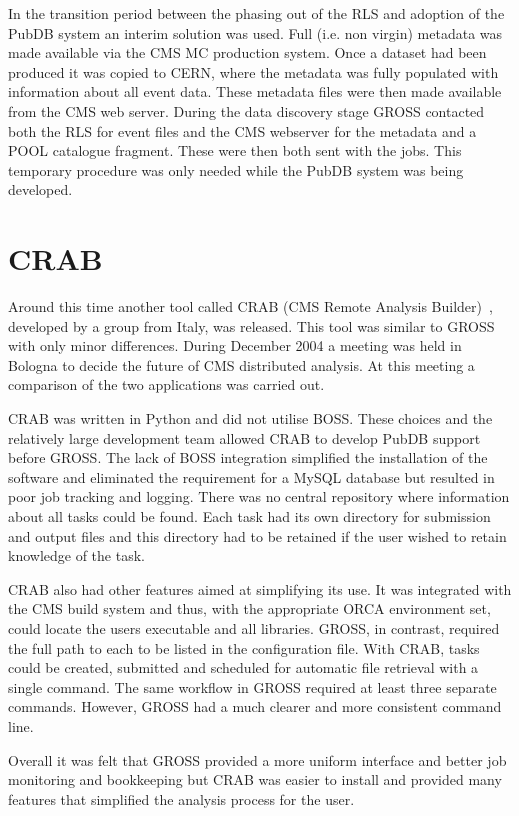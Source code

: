 In the transition period between the phasing out of the RLS and adoption of the PubDB system an interim solution was used. Full (i.e. non virgin) metadata was made available via the CMS MC production system. Once a dataset had been produced it was copied to CERN, where the metadata was fully populated with information about all event data. These metadata files were then made available from the CMS web server. During the data discovery stage GROSS contacted both the RLS for event files and the CMS webserver for the metadata and a POOL catalogue fragment. These were then both sent with the jobs. This temporary procedure was only needed while the PubDB system was being developed.

\section{CRAB}
Around this time another tool called CRAB (CMS Remote Analysis Builder)~\cite{citeulike:876380}, developed by a group from Italy, was released. This tool was similar to GROSS with only minor differences. During December 2004 a meeting was held in Bologna to decide the future of CMS distributed analysis. At this meeting a comparison of the two applications was carried out. 

CRAB was written in Python and did not utilise BOSS. These choices and the relatively large development team allowed CRAB to develop PubDB support before GROSS. The lack of BOSS integration simplified the installation of the software and eliminated the requirement for a MySQL database but resulted in poor job tracking and logging. There was no central repository where information about all tasks could be found. Each task had its own directory for submission and output files and this directory had to be retained if the user wished to retain knowledge of the task.

CRAB also had other features aimed at simplifying its use. It was integrated with the CMS build system and thus, with the appropriate ORCA environment set, could locate the users executable and all libraries. GROSS, in contrast, required the full path to each to be listed in the configuration file. With CRAB, tasks could be created, submitted and scheduled for automatic file retrieval with a single command. The same workflow in GROSS required at least three separate commands. However, GROSS had a much clearer and more consistent command line.

Overall it was felt that GROSS provided a more uniform interface and better job monitoring and bookkeeping but CRAB was easier to install and provided many features that simplified the analysis process for the user.

